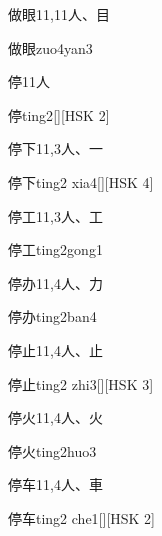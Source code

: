 \begin{entry}{做眼}{11,11}{⼈、⽬}
  \begin{phonetics}{做眼}{zuo4yan3}
  \end{phonetics}
\end{entry}

\begin{entry}{停}{11}{⼈}
  \begin{phonetics}{停}{ting2}[][HSK 2]
  \end{phonetics}
\end{entry}

\begin{entry}{停下}{11,3}{⼈、⼀}
  \begin{phonetics}{停下}{ting2 xia4}[][HSK 4]
  \end{phonetics}
\end{entry}

\begin{entry}{停工}{11,3}{⼈、⼯}
  \begin{phonetics}{停工}{ting2gong1}
  \end{phonetics}
\end{entry}

\begin{entry}{停办}{11,4}{⼈、⼒}
  \begin{phonetics}{停办}{ting2ban4}
  \end{phonetics}
\end{entry}

\begin{entry}{停止}{11,4}{⼈、⽌}
  \begin{phonetics}{停止}{ting2 zhi3}[][HSK 3]
  \end{phonetics}
\end{entry}

\begin{entry}{停火}{11,4}{⼈、⽕}
  \begin{phonetics}{停火}{ting2huo3}
  \end{phonetics}
\end{entry}

\begin{entry}{停车}{11,4}{⼈、⾞}
  \begin{phonetics}{停车}{ting2 che1}[][HSK 2]
  \end{phonetics}
\end{entry}

